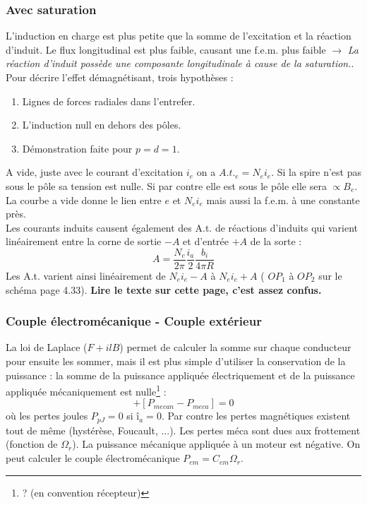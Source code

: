 		\subsubsection{Avec saturation}
		L'induction en charge est plus petite que la somme de l'excitation 
		et la réaction d'induit. Le flux longitudinal est plus faible, 
		causant une f.e.m. plus faible $\rightarrow$\textit{ La réaction 
		d'induit possède une composante longitudinale à cause de la 
		saturation.}. Pour décrire l'effet démagnétisant, trois hypothèses :
		\begin{enumerate}
		\item Lignes de forces radiales dans l'entrefer.
		\item L'induction null en dehors des pôles.
		\item Démonstration faite pour $p=d=1$.
		\end{enumerate}
		A vide, juste avec le courant d'excitation $i_e$ on a $A.t._e = 
		N_ei_e$. Si la spire n'est pas sous le pôle sa tension est nulle. 
		Si par contre elle est sous le pôle elle sera $\propto B_e$. La 
		courbe a vide donne le lien entre $e$ et $N_ei_e$ mais aussi la 
		f.e.m. à une constante près.\\
		Les courants induits causent également des A.t. de réactions 
		d'induits qui varient linéairement entre la corne de sortie $-A$ 
		et d'entrée $+A$ de la sorte :
		\begin{equation}
		A = \frac{N_c}{2\pi}\frac{i_a}{2}\frac{b_i}{4\pi R}
		\end{equation}
		Les A.t. varient ainsi linéairement de $N_ei_e-A$ à $N_ei_e+A$ (
		$OP_1$ à $OP_2$ sur le schéma page 4.33). \textbf{Lire le texte 
		sur cette page, c'est assez confus.}
		
		\subsubsection{Couple électromécanique - Couple extérieur}
		La loi de Laplace ($F+ilB$) permet de calculer la somme sur 
		chaque conducteur pour ensuite les sommer, mais il est plus 
		simple d'utiliser la conservation de la puissance : la somme 
		de la puissance appliquée électriquement et de la puissance 
		appliquée mécaniquement est nulle\footnote{? (en convention 
		récepteur)} :
		\begin{equation}
		[\underbrace{P_{electrique} - (P_{pJoule}}_{P_{electromecanique}}
		+P_{pmagn})] + [P_{mecan}-P_{meca}]=0
		\end{equation}
		où les pertes joules $P_{pJ}=0$ si $î_a=0$. Par contre les pertes 
		magnétiques existent tout de même (hystérèse, Foucault, ...). Les 
		pertes méca sont dues aux frottement (fonction de $\Omega_r$). La 
		puissance mécanique appliquée à un moteur est négative. On peut 
		calculer le couple électromécanique $P_{em} = C_{em}\Omega_r$.
		
		
		
		
		
		
		
		
		
		
		
		